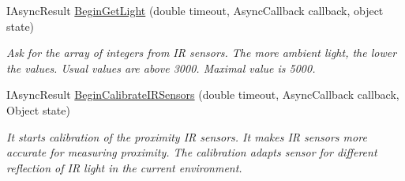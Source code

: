 \begin{DoxyCompactItemize}
  \item   IAsyncResult \hyperlink{class_elib_1_1_epuck_afa1833fd4dfb949fec35efa8ec774cf9}{BeginGetLight} (double timeout, AsyncCallback callback, object state)
  \begin{DoxyCompactList}\small\item\em Ask for the array of integers from IR sensors. The more ambient light, the lower the values. Usual values are above 3000. Maximal value is 5000. \item\end{DoxyCompactList}

  \item IAsyncResult \hyperlink{class_elib_1_1_epuck_a760541d00f318ee59be9fb1c83a0f8cd}{BeginCalibrateIRSensors} (double timeout, AsyncCallback callback, Object state)
  \begin{DoxyCompactList}\small\item\em It starts calibration of the proximity IR sensors. It makes IR sensors more accurate for measuring proximity. The calibration adapts sensor for different reflection of IR light in the current environment. \item\end{DoxyCompactList}

  \end{DoxyCompactItemize}

